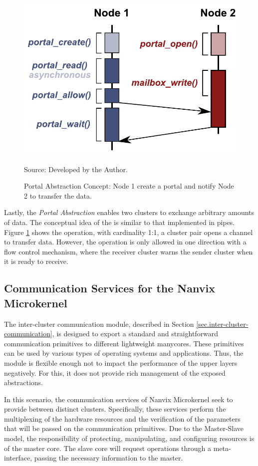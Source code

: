 				\begin{figure}[t]
					\centering
					\caption{Portal Abstraction Concept: Node 1 create a portal and notify Node 2 to transfer the data.}

					\includegraphics[width=.7\textwidth]{images/portal.pdf}%

					Source: Developed by the Author.
					\label{fig.conpt_portal}
				\end{figure}

				Lastly, the \textit{Portal Abstraction} enables two clusters to exchange arbitrary
				amounts of data.
				The conceptual idea of the \portal is similar to that implemented in \posix pipes.
				Figure \ref{fig.conpt_portal} shows the \portal operation, with cardinality
				1:1, a cluster pair opens a channel to transfer data.
				However, the operation is only allowed in one direction with a flow control mechanism,
				where the receiver cluster warns the sender cluster when it is ready to receive.
		
	\subsection{Communication Services for the Nanvix Microkernel}
	\label{sec.communication-services}
	
		The inter-cluster communication module, described in Section \ref{sec.inter-cluster-communication},
		is designed to export a standard and straightforward communication
		primitives to different lightweight manycores.
		These primitives can be used by various types of operating systems
		and applications.
		Thus, the module is flexible enough not to impact the performance
		of the upper layers negatively.
		For this, it does not provide rich management of the exposed abstractions.

		In this scenario, the communication services of Nanvix Microkernel seek
		to provide \ipc between distinct clusters.
		Specifically, these services perform the multiplexing of the hardware
		resources and the verification of the parameters that will be passed
		on the communication primitives.
		Due to the Master-Slave model, the responsibility of protecting,
		manipulating, and configuring \hal resources is of the master core.
		The slave core will request operations through a meta-interface,
		passing the necessary information to the master.

